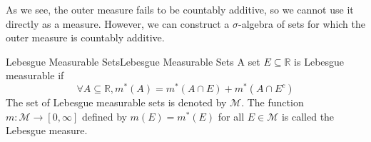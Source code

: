\documentclass[../main.tex]{subfiles}
\begin{document}
As we see, the outer measure fails to be countably additive, so we cannot use it directly as a measure. However, we can construct a $\sigma$-algebra of sets for which the outer measure is countably additive.

\begin{definition}{Lebesgue Measurable Sets}{Lebesgue Measurable Sets}
	A set $E \subseteq \mathbb{R}$ is Lebesgue measurable if
	\begin{equation}
	\forall A \subseteq \mathbb{R}, m^*(A) = m^*(A \cap E) + m^*(A \cap E^c)
	\end{equation}
	The set of Lebesgue measurable sets is denoted by $\mathcal{M}$. The function $m: \mathcal{M} \rightarrow [0,\infty ]$ defined by $m(E) = m^*(E)$ for all $E\in \mathcal{M}$ is called the Lebesgue measure.
\end{definition}
\end{document}
